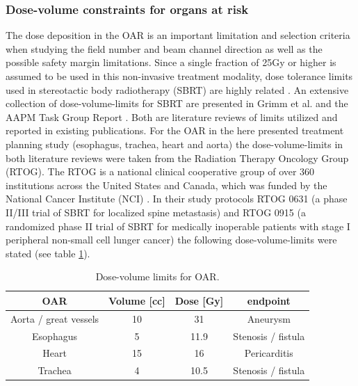 \newpage

\subsubsection{Dose-volume constraints for organs at risk}
\label{human:dose-volumeOar}
The dose deposition in the OAR is an important limitation and selection criteria when studying the field number and beam channel 
direction as well as the possible safety margin limitations. Since a single fraction of 25Gy or higher is assumed to be used in this 
non-invasive treatment modality, dose tolerance limits used in stereotactic body radiotherapy (SBRT) are highly related \cite{Ber12}. An 
extensive collection of dose-volume-limits for SBRT are presented in Grimm et al. \cite{Gri11} and the AAPM Task Group Report \cite{AAPM10}.  
Both are literature reviews of limits utilized and reported in existing publications. For the OAR in the here presented 
treatment planning study (esophagus, trachea, heart and aorta) the dose-volume-limits in both literature reviews were taken from the 
Radiation Therapy Oncology Group (RTOG). The RTOG is a national clinical cooperative group of over 360 institutions across the United 
States and Canada, which was funded by the National Cancer Institute (NCI) \cite{RTOG}. In their study protocols RTOG 0631 
(a phase II/III trial of SBRT for localized spine metastasis) \cite{RTOG0631} and RTOG 0915 (a randomized phase II trial of SBRT for 
medically inoperable patients with stage I peripheral non-small cell lunger cancer) \cite{RTOG0915} the following dose-volume-limits 
were stated (see table \ref{tab:RTOG}). 

\vspace*{-1cm}

\begin{table}[H]
  \centering
  \footnotesize
  \caption{Dose-volume limits for OAR.}
  \begin{tabular}{|c|c|c|c|}
    \hline\hline
    OAR & Volume [cc] & Dose [Gy] & endpoint \\
    \hline
    Aorta / great vessels & 10 & 31 & Aneurysm \\
    Esophagus & 5 & 11.9 &  Stenosis / fistula \\
    Heart & 15 & 16 & Pericarditis \\
    Trachea & 4 & 10.5 & Stenosis / fistula \\
    \hline\hline
  \end{tabular}
  \label{tab:RTOG}
\end{table}

